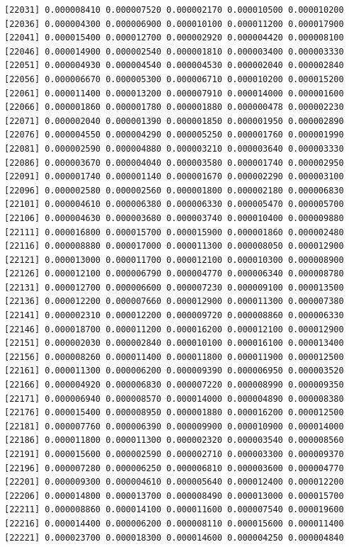 \documentclass[]{article}
\begin{document}
\begin{verbatim}
[22031] 0.000008410 0.000007520 0.000002170 0.000010500 0.000010200
[22036] 0.000004300 0.000006900 0.000010100 0.000011200 0.000017900
[22041] 0.000015400 0.000012700 0.000002920 0.000004420 0.000008100
[22046] 0.000014900 0.000002540 0.000001810 0.000003400 0.000003330
[22051] 0.000004930 0.000004540 0.000004530 0.000002040 0.000002840
[22056] 0.000006670 0.000005300 0.000006710 0.000010200 0.000015200
[22061] 0.000011400 0.000013200 0.000007910 0.000014000 0.000001600
[22066] 0.000001860 0.000001780 0.000001880 0.000000478 0.000002230
[22071] 0.000002040 0.000001390 0.000001850 0.000001950 0.000002890
[22076] 0.000004550 0.000004290 0.000005250 0.000001760 0.000001990
[22081] 0.000002590 0.000004880 0.000003210 0.000003640 0.000003330
[22086] 0.000003670 0.000004040 0.000003580 0.000001740 0.000002950
[22091] 0.000001740 0.000001140 0.000001670 0.000002290 0.000003100
[22096] 0.000002580 0.000002560 0.000001800 0.000002180 0.000006830
[22101] 0.000004610 0.000006380 0.000006330 0.000005470 0.000005700
[22106] 0.000004630 0.000003680 0.000003740 0.000010400 0.000009880
[22111] 0.000016800 0.000015700 0.000015900 0.000001860 0.000002480
[22116] 0.000008880 0.000017000 0.000011300 0.000008050 0.000012900
[22121] 0.000013000 0.000011700 0.000012100 0.000010300 0.000008900
[22126] 0.000012100 0.000006790 0.000004770 0.000006340 0.000008780
[22131] 0.000012700 0.000006600 0.000007230 0.000009100 0.000013500
[22136] 0.000012200 0.000007660 0.000012900 0.000011300 0.000007380
[22141] 0.000002310 0.000012200 0.000009720 0.000008860 0.000006330
[22146] 0.000018700 0.000011200 0.000016200 0.000012100 0.000012900
[22151] 0.000002030 0.000002840 0.000010100 0.000016100 0.000013400
[22156] 0.000008260 0.000011400 0.000011800 0.000011900 0.000012500
[22161] 0.000011300 0.000006200 0.000009390 0.000006950 0.000003520
[22166] 0.000004920 0.000006830 0.000007220 0.000008990 0.000009350
[22171] 0.000006940 0.000008570 0.000014000 0.000004890 0.000008380
[22176] 0.000015400 0.000008950 0.000001880 0.000016200 0.000012500
[22181] 0.000007760 0.000006390 0.000009900 0.000010900 0.000014000
[22186] 0.000011800 0.000011300 0.000002320 0.000003540 0.000008560
[22191] 0.000015600 0.000002590 0.000002710 0.000003300 0.000009370
[22196] 0.000007280 0.000006250 0.000006810 0.000003600 0.000004770
[22201] 0.000009300 0.000004610 0.000005640 0.000012400 0.000012200
[22206] 0.000014800 0.000013700 0.000008490 0.000013000 0.000015700
[22211] 0.000008860 0.000014100 0.000011600 0.000007540 0.000019600
[22216] 0.000014400 0.000006200 0.000008110 0.000015600 0.000011400
[22221] 0.000023700 0.000018300 0.000014600 0.000004250 0.000004840

\end{verbatim}
\end{document}
